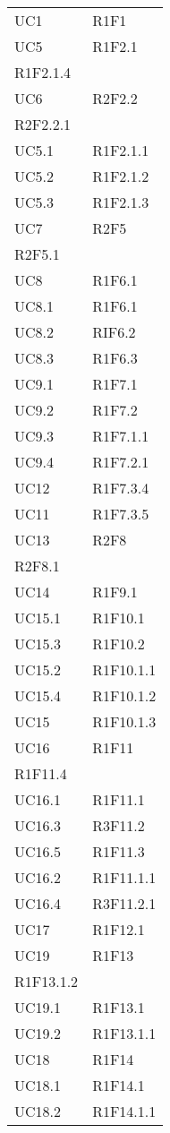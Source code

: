 \begin{longtable}{|C{6.5cm}|C{6.5cm}|}
	UC1 & R1F1 \\
	UC5 & \centering R1F2.1 \\ R1F2.1.4 \tabularnewline
	UC6 & \centering R2F2.2 \\ R2F2.2.1 \tabularnewline
	UC5.1 & R1F2.1.1 \\
	UC5.2 & R1F2.1.2 \\
	UC5.3 & R1F2.1.3 \\
	UC7 & \centering R2F5 \\ R2F5.1 \tabularnewline
	UC8 & R1F6.1 \\
	UC8.1 & R1F6.1 \\
    UC8.2 & RIF6.2 \\
	UC8.3 & R1F6.3 \\
	UC9.1 & R1F7.1 \\
	UC9.2 & R1F7.2 \\
	UC9.3 & R1F7.1.1 \\
	UC9.4 & R1F7.2.1 \\
	UC12 & R1F7.3.4 \\
	UC11 & R1F7.3.5 \\
	UC13 & \centering R2F8 \\ R2F8.1 \tabularnewline
	UC14 & R1F9.1 \\
	UC15.1 & R1F10.1 \\
	UC15.3 & R1F10.2 \\
	UC15.2 & R1F10.1.1 \\
	UC15.4 & R1F10.1.2 \\
	UC15 & R1F10.1.3 \\
	UC16 & \centering R1F11 \\ R1F11.4 \tabularnewline
	UC16.1 & R1F11.1 \\
	UC16.3 & R3F11.2 \\
	UC16.5 & R1F11.3 \\
	UC16.2 & R1F11.1.1 \\
	UC16.4 & R3F11.2.1 \\
	UC17 & R1F12.1 \\
	UC19 & \centering R1F13 \\ R1F13.1.2 \tabularnewline
	UC19.1 & R1F13.1 \\
	UC19.2 & R1F13.1.1 \\
	UC18 & R1F14 \\
	UC18.1 & R1F14.1 \\
	UC18.2 & R1F14.1.1 \\

\end{longtable}
